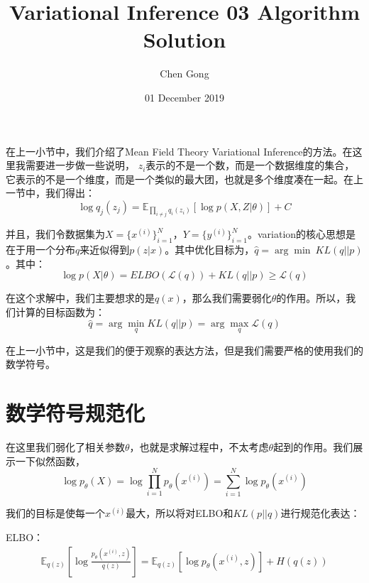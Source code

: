 \documentclass[a4paper]{article}
\title{Variational Inference 03 Algorithm Solution}
\author{Chen Gong}
\date{01 December 2019}
\begin{document}
\maketitle

在上一小节中，我们介绍了Mean Field Theory Variational Inference的方法。在这里我需要进一步做一些说明，{\color{red} $z_i$表示的不是一个数，而是一个数据维度的集合，它表示的不是一个维度，而是一个类似的最大团，也就是多个维度凑在一起。}在上一节中，我们得出：
\begin{equation}
    \log q_j(z_j) = \mathbb{E}_{\prod_{i \neq j}q_i(z_i)}\left[ \log p(X,Z|\theta) \right] + C
\end{equation}

并且，我们令数据集为$X = \{ x^{(i)} \}_{i=1}^N$，$Y = \{ y^{(i)} \}_{i=1}^N$。variation的核心思想是在于用一个分布$q$来近似得到$p(z|x)$。其中优化目标为，$\hat{q} = \arg\min\ KL(q||p)$。其中：
\begin{equation}
    \log p(X|\theta) = ELBO (\mathcal{L}(q)) + KL(q||p) \geq  \mathcal{L}(q)
\end{equation}

在这个求解中，我们主要想求的是$q(x)$，那么我们需要弱化$\theta$的作用。所以，我们计算的目标函数为：
\begin{equation}
    \hat{q} = \arg\min_{q} KL(q||p) = \arg\max_q \mathcal{L}(q)
\end{equation}

在上一小节中，这是我们的便于观察的表达方法，但是我们需要严格的使用我们的数学符号。

\section{数学符号规范化}
在这里我们弱化了相关参数$\theta$，也就是求解过程中，不太考虑$\theta$起到的作用。我们展示一下似然函数，
\begin{equation}
    \log p_{\theta}(X) = \log \prod_{i=1}^N p_{\theta}(x^{(i)}) = \sum_{i=1}^N \log p_{\theta}(x^{(i)})
\end{equation}

我们的目标是使每一个$x^{(i)}$最大，所以将对ELBO和$KL(p||q)$进行规范化表达：

ELBO：
\begin{equation}
    \begin{split}
        \mathbb{E}_{q(z)}\left[ \log \frac{p_{\theta}(x^{(i)},z)}{q(z)} \right] = \mathbb{E}_{q(z)}\left[ \log p_{\theta}(x^{(i)},z) \right]+ H(q(z))
    \end{split}
\end{equation}
\end{document}
